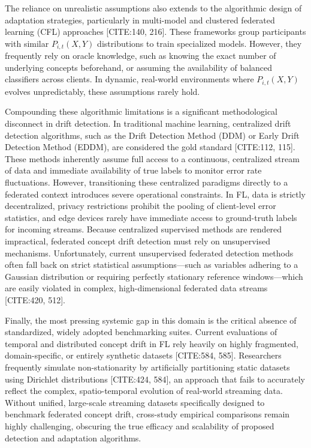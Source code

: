 \documentclass[journal]{IEEEtran}
\begin{document}
The reliance on unrealistic assumptions also extends to the algorithmic design of adaptation strategies, particularly in multi-model and clustered federated learning (CFL) approaches [CITE:140, 216]. These frameworks group participants with similar $P_{i,t}(X, Y)$ distributions to train specialized models. However, they frequently rely on oracle knowledge, such as knowing the exact number of underlying concepts beforehand, or assuming the availability of balanced classifiers across clients. In dynamic, real-world environments where $P_{i,t}(X, Y)$ evolves unpredictably, these assumptions rarely hold. 

Compounding these algorithmic limitations is a significant methodological disconnect in drift detection. In traditional machine learning, centralized drift detection algorithms, such as the Drift Detection Method (DDM) or Early Drift Detection Method (EDDM), are considered the gold standard [CITE:112, 115]. These methods inherently assume full access to a continuous, centralized stream of data and immediate availability of true labels to monitor error rate fluctuations. However, transitioning these centralized paradigms directly to a federated context introduces severe operational constraints. In FL, data is strictly decentralized, privacy restrictions prohibit the pooling of client-level error statistics, and edge devices rarely have immediate access to ground-truth labels for incoming streams. Because centralized supervised methods are rendered impractical, federated concept drift detection must rely on unsupervised mechanisms. Unfortunately, current unsupervised federated detection methods often fall back on strict statistical assumptions—such as variables adhering to a Gaussian distribution or requiring perfectly stationary reference windows—which are easily violated in complex, high-dimensional federated data streams [CITE:420, 512].

Finally, the most pressing systemic gap in this domain is the critical absence of standardized, widely adopted benchmarking suites. Current evaluations of temporal and distributed concept drift in FL rely heavily on highly fragmented, domain-specific, or entirely synthetic datasets [CITE:584, 585]. Researchers frequently simulate non-stationarity by artificially partitioning static datasets using Dirichlet distributions [CITE:424, 584], an approach that fails to accurately reflect the complex, spatio-temporal evolution of real-world streaming data. Without unified, large-scale streaming datasets specifically designed to benchmark federated concept drift, cross-study empirical comparisons remain highly challenging, obscuring the true efficacy and scalability of proposed detection and adaptation algorithms. 
\end{document}
